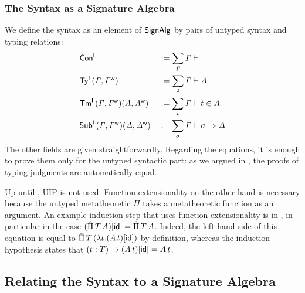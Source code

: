 \subsubsection{The Syntax as a Signature Algebra}

\begin{definition}\label{def:syntax}
  We define the syntax as an element of $\mathsf{SignAlg}$ by pairs of untyped
  syntax and typing relations:
\begin{alignat*}{5}
 & {\mathsf{Con}}^{\mathsf{I}} && := \sum_{\mathit{\Gamma}} \mathit{\Gamma}\vdash
 \\
 & {\mathsf{Ty}}^{\mathsf{I}} \,(\mathit{\Gamma},{\mathit{\Gamma}}^{\mathsf{w}})&& := \sum_A \mathit{\Gamma}\vdash A
 \\
 & {\mathsf{Tm}}^{\mathsf{I}} \,(\mathit{\Gamma},{\mathit{\Gamma}}^{\mathsf{w}})(A,{A}^{\mathsf{w}})&& := \sum_t \mathit{\Gamma}\vdash t \in A
 \\
 & {\mathsf{Sub}}^{\mathsf{I}} \,(\mathit{\Gamma},{\mathit{\Gamma}}^{\mathsf{w}})(\mathit{\Delta},{\mathit{\Delta}}^{\mathsf{w}})&& := \sum_\sigma \mathit{\Gamma}\vdash \sigma \Rightarrow \mathit{\Delta}
\end{alignat*}
The other fields are given straightforwardly.  Regarding the equations, it is
enough to prove them only for the untyped syntactic part: as we argued in
, the proofs of typing judgments are
automatically equal.
\end{definition}

\begin{remark}
  Up until , UIP is not used. Function extensionality
  on the other hand is necessary because the untyped metatheoretic
  $\Pi$ takes a metatheoretic function as an argument. An example
  induction step that uses function extensionality is in
  , in particular in the case
  $(\hat{\Pi}\,T\, A)[\mathsf{id}]=\hat{\Pi}\,T\,A$. Indeed, the left hand side of this
  equation is equal to $\hat{\Pi}\,T\,(\lambda t.(A\,t)[\mathsf{id}])$ by
  definition, whereas the induction hypothesis states that
  $(t:T)\rightarrow (A\,t)[\mathsf{id}]=A\,t$.
\end{remark}

\subsection{Relating the Syntax to a Signature Algebra}
\label{sec:streicher}


